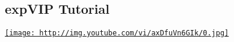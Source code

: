 \subsection{expVIP Tutorial}\label{expvip-tutorial}

\href{https://www.youtube.com/watch?v=axDfuVn6GIk}{\texttt{[image: http://img.youtube.com/vi/axDfuVn6GIk/0.jpg]}}
